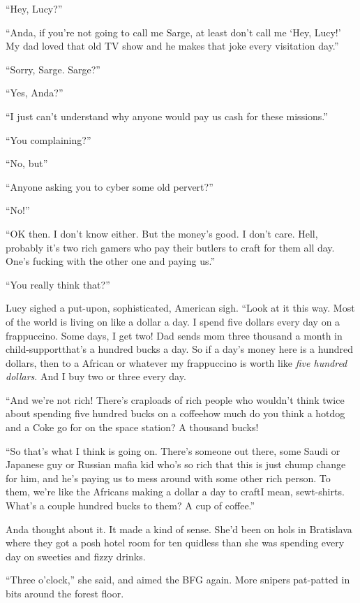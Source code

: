 “Hey, Lucy?”

“Anda, if you’re not going to call me Sarge, at least don’t call me
‘Hey, Lucy!’ My dad loved that old TV show and he makes that joke
every visitation day.”

“Sorry, Sarge. Sarge?”

“Yes, Anda?”

“I just can’t understand why anyone would pay us cash for these
missions.”

“You complaining?”

“No, but\dash{}”

“Anyone asking you to cyber some old pervert?”

“No!”

“OK then. I don’t know either. But the money’s good. I don’t care.
Hell, probably it’s two rich gamers who pay their butlers to craft
for them all day. One’s fucking with the other one and paying us.”

“You really think that?”

Lucy sighed a put-upon, sophisticated, American sigh. “Look at it
this way. Most of the world is living on like a dollar a day. I
spend five dollars every day on a frappuccino. Some days, I get
two! Dad sends mom three thousand a month in child-support\dash{}that’s a
hundred bucks a day. So if a day’s money here is a hundred dollars,
then to a African or whatever my frappuccino is worth like
\emph{five hundred dollars}. And I buy two or three every day.

“And we’re not rich! There’s craploads of rich people who wouldn’t
think twice about spending five hundred bucks on a coffee\dash{}how much
do you think a hotdog and a Coke go for on the space station? A
thousand bucks!

“So that’s what I think is going on. There’s someone out there,
some Saudi or Japanese guy or Russian mafia kid who’s so rich that
this is just chump change for him, and he’s paying us to mess
around with some other rich person. To them, we’re like the
Africans making a dollar a day to craft\dash{}I mean, sew\dash{}t-shirts.
What’s a couple hundred bucks to them? A cup of coffee.”

Anda thought about it. It made a kind of sense. She’d been on hols
in Bratislava where they got a posh hotel room for ten quid\dash{}less
than she was spending every day on sweeties and fizzy drinks.

“Three o’clock,” she said, and aimed the BFG again. More snipers
pat-patted in bits around the forest floor.

